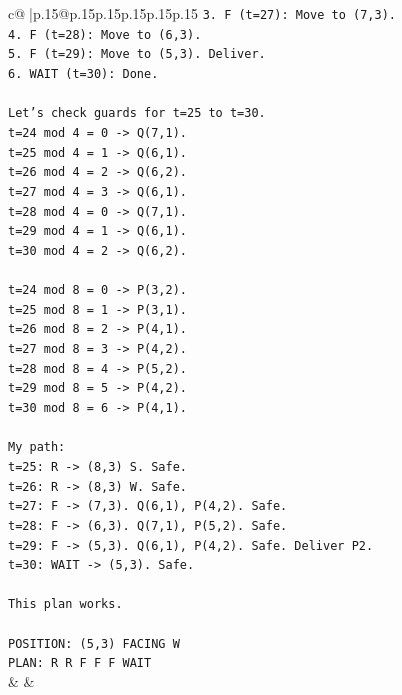\documentclass{article}
\begin{document}
{\begin{supertabular}{c@{$\;$}|p{.15\linewidth}@{}p{.15\linewidth}p{.15\linewidth}p{.15\linewidth}p{.15\linewidth}p{.15\linewidth}}
{{{\texttt{3. F (t=27): Move to (7,3).} \\
\texttt{4. F (t=28): Move to (6,3).} \\
\texttt{5. F (t=29): Move to (5,3). Deliver.} \\
\texttt{6. WAIT (t=30): Done.} \\
\\ 
\texttt{Let's check guards for t=25 to t=30.} \\
\texttt{t=24 mod 4 = 0 {-}> Q(7,1).} \\
\texttt{t=25 mod 4 = 1 {-}> Q(6,1).} \\
\texttt{t=26 mod 4 = 2 {-}> Q(6,2).} \\
\texttt{t=27 mod 4 = 3 {-}> Q(6,1).} \\
\texttt{t=28 mod 4 = 0 {-}> Q(7,1).} \\
\texttt{t=29 mod 4 = 1 {-}> Q(6,1).} \\
\texttt{t=30 mod 4 = 2 {-}> Q(6,2).} \\
\\ 
\texttt{t=24 mod 8 = 0 {-}> P(3,2).} \\
\texttt{t=25 mod 8 = 1 {-}> P(3,1).} \\
\texttt{t=26 mod 8 = 2 {-}> P(4,1).} \\
\texttt{t=27 mod 8 = 3 {-}> P(4,2).} \\
\texttt{t=28 mod 8 = 4 {-}> P(5,2).} \\
\texttt{t=29 mod 8 = 5 {-}> P(4,2).} \\
\texttt{t=30 mod 8 = 6 {-}> P(4,1).} \\
\\ 
\texttt{My path:} \\
\texttt{t=25: R {-}> (8,3) S. Safe.} \\
\texttt{t=26: R {-}> (8,3) W. Safe.} \\
\texttt{t=27: F {-}> (7,3). Q(6,1), P(4,2). Safe.} \\
\texttt{t=28: F {-}> (6,3). Q(7,1), P(5,2). Safe.} \\
\texttt{t=29: F {-}> (5,3). Q(6,1), P(4,2). Safe. Deliver P2.} \\
\texttt{t=30: WAIT {-}> (5,3). Safe.} \\
\\ 
\texttt{This plan works.} \\
\\ 
\texttt{POSITION: (5,3) FACING W} \\
\texttt{PLAN: R R F F F WAIT} \\
            }
        }
    }
    & & \\ \\


\end{supertabular}}
\end{document}
